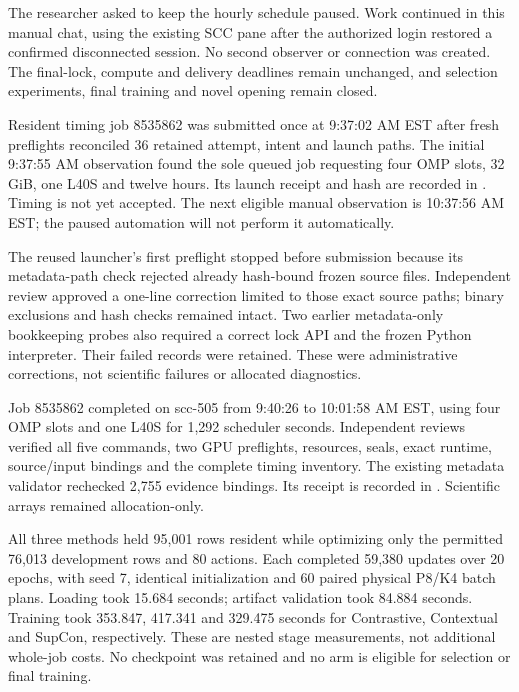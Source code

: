 The researcher asked to keep the hourly schedule paused. Work continued in this
manual chat, using the existing SCC pane after the authorized login restored a
confirmed disconnected session. No second observer or connection was created.
The final-lock, compute and delivery deadlines remain unchanged, and selection
experiments, final training and novel opening remain closed.


Resident timing job 8535862 was submitted once at 9:37:02 AM EST after fresh
preflights reconciled 36 retained attempt, intent and launch paths. The initial
9:37:55 AM observation found the sole queued job requesting four OMP slots,
32 GiB, one L40S and twelve hours. Its launch receipt and hash are recorded in
. Timing is not yet accepted. The next
eligible manual observation is 10:37:56 AM EST; the paused automation will not
perform it automatically.

The reused launcher's first preflight stopped before submission because its
metadata-path check rejected already hash-bound frozen source files. Independent
review approved a one-line correction limited to those exact source paths;
binary exclusions and hash checks remained intact. Two earlier metadata-only
bookkeeping probes also required a correct lock API and the frozen Python
interpreter. Their failed records were retained. These were administrative
corrections, not scientific failures or allocated diagnostics.



Job 8535862 completed on scc-505 from 9:40:26 to 10:01:58 AM EST, using
four OMP slots and one L40S for 1,292 scheduler seconds. Independent reviews
verified all five commands, two GPU preflights, resources, seals, exact runtime,
source/input bindings and the complete timing inventory. The existing metadata
validator rechecked 2,755 evidence bindings. Its receipt is recorded in
. Scientific arrays remained allocation-only.

All three methods held 95,001 rows resident while optimizing only the permitted
76,013 development rows and 80 actions. Each completed 59,380 updates over
20 epochs, with seed 7, identical initialization and 60 paired physical P8/K4
batch plans. Loading took 15.684 seconds; artifact validation took 84.884 seconds.
Training took 353.847, 417.341 and 329.475 seconds for Contrastive, Contextual
and SupCon, respectively. These are nested stage measurements, not additional
whole-job costs. No checkpoint was retained and no arm is eligible for selection
or final training.

